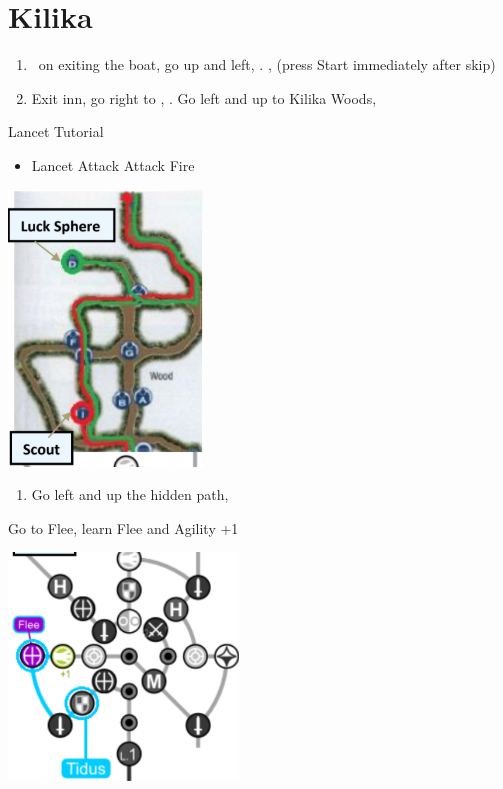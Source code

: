 \chapter{Kilika}

\begin{enumerate}
  \item \sd\ on exiting the boat, go up and left, \sd. \skippablefmv[2:00], (press Start immediately after skip) \sd
  \item Exit inn, go right to \wakka, \sd. Go left and up to Kilika Woods, \sd
\end{enumerate}
\begin{battle}{Lancet Tutorial}
  \begin{itemize}
    \item \sd
          \kimahrif Lancet
          \tidusf Attack
          \yunaf Attack
          \luluf Fire
  \end{itemize}
\end{battle}
\includegraphics{graphics/kilikamap}
\begin{enumerate}[resume]
  \item Go left and up the hidden path, 
\end{enumerate}
\begin{spheregrid}
  \begin{itemize}
    \tidusf Go to Flee, learn Flee and Agility +1
  \end{itemize}
  \includegraphics{graphics/tidusflee}
\end{spheregrid}
